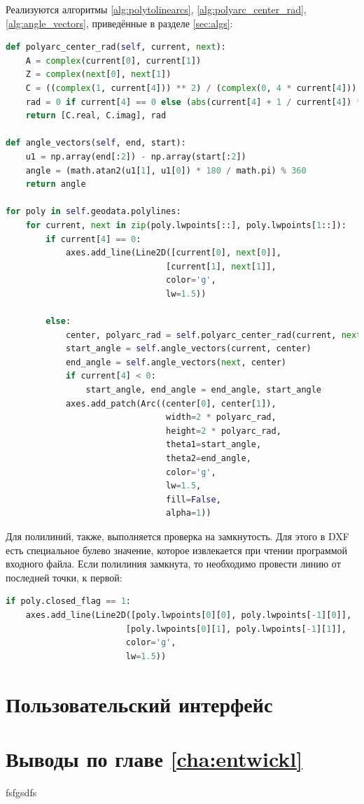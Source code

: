 Реализуются алгоритмы \ref{alg:polytolinearcs}, \ref{alg:polyarc_center_rad}, \ref{alg:angle_vectors}, приведённые в разделе \ref{sec:algs}:
\begin{lstlisting}[language=python,label=list:sketch]
def polyarc_center_rad(self, current, next):
	A = complex(current[0], current[1])
	Z = complex(next[0], next[1])
	C = ((complex(1, current[4])) ** 2) / (complex(0, 4 * current[4])) * A - ((complex(1, -current[4])) ** 2) / (complex(0, 4 * current[4])) * Z
	rad = 0 if current[4] == 0 else (abs(current[4] + 1 / current[4]) * math.sqrt((next[0] - current[0]) ** 2 + (next[1] - current[1]) ** 2) / 4)
	return [C.real, C.imag], rad

def angle_vectors(self, end, start):
	u1 = np.array(end[:2]) - np.array(start[:2])
	angle = (math.atan2(u1[1], u1[0]) * 180 / math.pi) % 360
	return angle

for poly in self.geodata.polylines:
	for current, next in zip(poly.lwpoints[::], poly.lwpoints[1::]):
		if current[4] == 0:
			axes.add_line(Line2D([current[0], next[0]],
								[current[1], next[1]],
								color='g',
								lw=1.5))

		else:
			center, polyarc_rad = self.polyarc_center_rad(current, next)
			start_angle = self.angle_vectors(current, center)
			end_angle = self.angle_vectors(next, center)
			if current[4] < 0:
				start_angle, end_angle = end_angle, start_angle
			axes.add_patch(Arc((center[0], center[1]),
								width=2 * polyarc_rad,
								height=2 * polyarc_rad,
								theta1=start_angle,
								theta2=end_angle,
								color='g',
								lw=1.5,
								fill=False,
								alpha=1))
\end{lstlisting}

Для полилиний, также, выполняется проверка на замкнутость.  Для этого в DXF есть специальное булево значение, которое извлекается при чтении программой входного файла. Если полилиния замкнута, то необходимо провести линию от последней точки, к первой:
\begin{lstlisting}[language=python,label=list:closedflag]
if poly.closed_flag == 1:
	axes.add_line(Line2D([poly.lwpoints[0][0], poly.lwpoints[-1][0]],
						[poly.lwpoints[0][1], poly.lwpoints[-1][1]],
						color='g',
						lw=1.5))
\end{lstlisting}

\section{Пользовательский интерфейс}

\section{Выводы по главе \ref{cha:entwickl}}
fsfgsdfs
